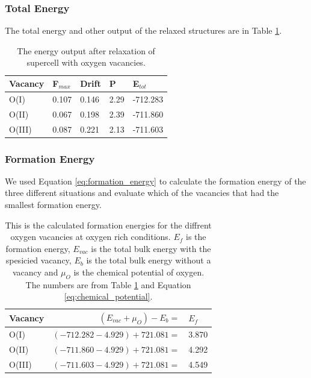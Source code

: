 \subsubsection{Total Energy}

The total energy and other output of the relaxed structures are in Table \ref{tab:energy_supercell_vacancies}.

\begin{table}[H]\caption{The energy output after relaxation of supercell with oxygen vacancies.}\label{tab:energy_supercell_vacancies}
\begin{tabular}{l|llll}
Vacancy& F$_{max}$ &	Drift&	P&	E$_{tot}$ \\ \hline
O(I)&    0.107&	    0.146&	2.29	&    -712.283\\
O(II)&    0.067&	    0.198&	2.39	&    -711.860\\
O(III)&    0.087&    0.221&	2.13	&    -711.603\\
\end{tabular}
\end{table}

\subsubsection{Formation Energy}

We used Equation \ref{eq:formation_energy} to calculate the formation energy of the three different situations and evaluate which of the vacancies that had the smallest formation energy. 

\begin{table}[H]\caption{This is the calculated formation energies for the diffrent oxygen vacancies at oxygen rich conditions. $E_f$ is the formation energy, $E_{vac}$ is the total bulk energy with the spesicied vacancy, $E_b$ is the total bulk energy without a vacancy and $\mu_O$ is the chemical potential of oxygen. The numbers are from Table \ref{tab:energy_supercell_vacancies} and Equation \ref{eq:chemical_potential}.}\label{tab:energy_formation}
\begin{tabular}{l|rl}
\footnotesize Vacancy&$(E_{vac} + \mu_O)- E_b = $ &$E_f$ \\ \hline
\small O(I)&$(-712.282 -4.929)+721.081 =$ &3.870\\
\small O(II)&$(-711.860 -4.929)+721.081 =$ &4.292\\
\small O(III)&$(-711.603 -4.929)+721.081 =$ &4.549\\
\end{tabular}
\end{table}

